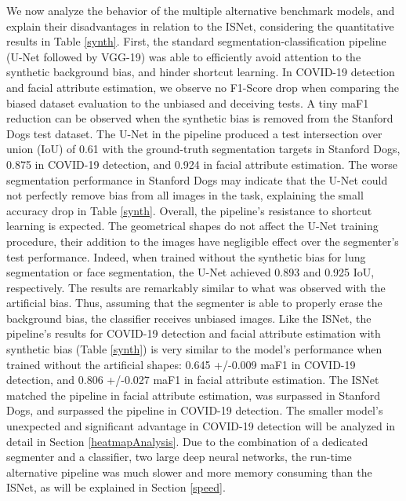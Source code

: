 \documentclass[fleqn,10pt]{wlscirep}
\begin{document}
{We now analyze the behavior of the multiple alternative benchmark models, and explain their disadvantages in relation to the ISNet, considering the quantitative results in Table \ref{synth}. First, the standard segmentation-classification pipeline (U-Net followed by VGG-19) was able to efficiently avoid attention to the synthetic background bias, and hinder shortcut learning. In COVID-19 detection and facial attribute estimation, we observe no F1-Score drop when comparing the biased dataset evaluation to the unbiased and deceiving tests. A tiny maF1 reduction can be observed when the synthetic bias is removed from the Stanford Dogs test dataset. The U-Net in the pipeline produced a test intersection over union (IoU) of 0.61 with the ground-truth segmentation targets in Stanford Dogs, 0.875 in COVID-19 detection, and 0.924 in facial attribute estimation. The worse segmentation performance in Stanford Dogs may indicate that the U-Net could not perfectly remove bias from all images in the task, explaining the small accuracy drop in Table \ref{synth}. Overall, the pipeline's resistance to shortcut learning is expected. The geometrical shapes do not affect the U-Net training procedure, their addition to the images have negligible effect over the segmenter's test performance. Indeed, when trained without the synthetic bias for lung segmentation or face segmentation, the U-Net achieved 0.893 and 0.925 IoU, respectively. The results are remarkably similar to what was observed with the artificial bias. Thus, assuming that the segmenter is able to properly erase the background bias, the classifier receives unbiased images. Like the ISNet, the pipeline's results for COVID-19 detection and facial attribute estimation with synthetic bias (Table \ref{synth}) is very similar to the model's performance when trained without the artificial shapes: 0.645 +/-0.009 maF1 in COVID-19 detection, and 0.806 +/-0.027 maF1 in facial attribute estimation. The ISNet matched the pipeline in facial attribute estimation, was surpassed in Stanford Dogs, and surpassed the pipeline in COVID-19 detection. The smaller model's unexpected and significant advantage in COVID-19 detection will be analyzed in detail in Section \ref{heatmapAnalysis}. Due to the combination of a dedicated segmenter and a classifier, two large deep neural networks, the run-time alternative pipeline was much slower and more memory consuming than the ISNet, as will be explained in Section \ref{speed}.

}
\end{document}
